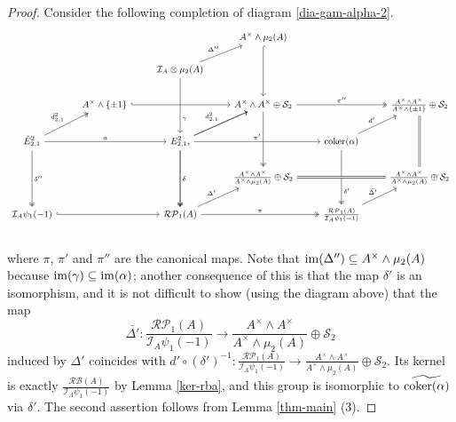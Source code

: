 \documentclass[11pt]{amsart}
\theoremstyle{definition}
\theoremstyle{plain}
\numberwithin{equation}{section}
\newcommand{\II}{\mathcal{I}}
\newcommand{\RP}{\mathcal{RP}}
\newcommand{\RB}{\mathcal{RB}}
\renewcommand{\SS}{\mathcal{S}}
\renewcommand{\aa}{{A^\times}}
\newcommand{\im}{{\rm im}}
\newcommand{\coker}{{\rm coker}}
\begin{document}
\begin{proof}
Consider the following completion of diagram \eqref{dia-gam-alpha-2}.
\[
{\small
\begin{tikzcd}
   & & & \aa\wedge\mu_2(A)\ar[dd,hook] & &\\
   & & \II_A\otimes\mu_2(A)\ar[ru,"\Delta''"]\ar[dd,"\gamma" near end] & & &\\
   & \aa\wedge\{\pm 1\}\ar[rr,hook] & & \aa\wedge\aa\oplus\SS_2\ar[rr,twoheadrightarrow,"\pi''"]\ar[dd,twoheadrightarrow] & & \frac{\aa\wedge\aa}{\aa\wedge\{\pm 1\}}\oplus\SS_2\ar[dd,equal]\\
   \hat{E}^2_{2,1}\ar[ru,twoheadrightarrow,"\hat{d}^2_{2,1}"]\ar[rr,"\alpha"]\ar[dd,twoheadrightarrow,"\delta''"] & & E^2_{2,1}\ar[ru,"d^2_{2,1}"]\ar[dd,twoheadrightarrow,"\delta"],\ar[rr,"\pi'"]\ar[ru]\ar[dd,twoheadrightarrow] & & \coker(\alpha)\ar[ru,"d'"]\ar[dd,twoheadrightarrow,"\delta'" near end] &\\
   & & & \frac{\aa\wedge\aa}{\aa\wedge\mu_2(A)}\oplus\SS_2\ar[rr,equal] & & \frac{\aa\wedge\aa}{\aa\wedge\mu_2(A)}\oplus\SS_2\\
   \II_A\psi_1(-1)\ar[rr,hook] & & \RP_1(A)\ar[rr,twoheadrightarrow,"\pi"]\ar[ru,"\Delta'"] & & \frac{\RP_1(A)}{\II_A\psi_1(-1)}\ar[ru,"\bar{\Delta'}"] &\\
\end{tikzcd}
}
\]
where $\pi$, $\pi'$ and $\pi''$ are the canonical maps. Note that $\im(\Delta'')\subseteq\aa\wedge\mu_2(A)$ because $\im(\gamma)\subseteq\im(\alpha)$; another consequence of this is that the map $\delta'$ is an isomorphism, and it is not difficult to show (using the diagram above) that the map
\[
    \bar{\Delta'}:\frac{\RP_1(A)}{\II_A\psi_1(-1)}\to\frac{\aa\wedge\aa}{\aa\wedge\mu_2(A)}\oplus\SS_2
\]
induced by $\Delta'$ coincides with $d'\circ(\delta')^{-1}:\frac{\RP_1(A)}{\II_A\psi_1(-1)}\to\frac{\aa\wedge\aa}{\aa\wedge\mu_2(A)}\oplus\SS_2$. Its kernel is exactly $\frac{\RB(A)}{\II_A\psi_1(-1)}$ by Lemma \ref{ker-rba}, and this group is isomorphic to $\widetilde{\coker(\alpha)}$ via $\delta'$.
The second assertion follows from Lemma \ref{thm-main} (3).
\end{proof}
\end{document}
